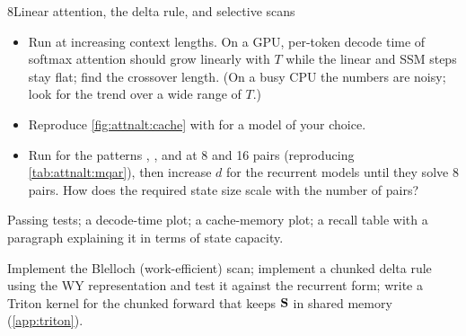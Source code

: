 \begin{labbox}{8}{Linear attention, the delta rule, and selective scans}
\begin{itemize}
\item Run  at increasing context lengths. On a GPU, per-token decode time of softmax
  attention should grow linearly with $T$ while the linear and SSM steps stay flat; find the crossover length.
  (On a busy CPU the numbers are noisy; look for the trend over a wide range of $T$.)
\item Reproduce \cref{fig:attnalt:cache} with  for a model of your choice.
\item Run  for the patterns , ,  and  at 8 and 16 pairs
  (reproducing \cref{tab:attnalt:mqar}), then increase $d$ for the recurrent models until they solve 8 pairs.
  How does the required state size scale with the number of pairs?
\end{itemize}

Passing tests; a decode-time plot; a cache-memory plot; a recall table with a paragraph explaining it in
terms of state capacity.

Implement the Blelloch (work-efficient) scan; implement a chunked delta rule using the WY representation and
test it against the recurrent form; write a Triton kernel for the chunked forward that keeps $\mathbf{S}$ in
shared memory (\cref{app:triton}).
\end{labbox}
